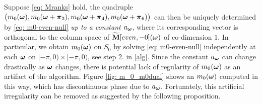 Suppose \eqref{eq: Mranks} hold, the quadruple  $\big( m_0(\boldsymbol{\omega}),m_0(\boldsymbol{\omega}+\boldsymbol{\pi}_2), m_0(\boldsymbol{\omega} +\boldsymbol{\pi}_4), m_0(\boldsymbol{\omega}+\boldsymbol{\pi}_6) \big)$ can then be uniquely determined by \eqref{eq: m0-even-null} {\it up to a constant $a_{\boldsymbol{\omega}} $}, where its corresponding vector is orthogonal to the column space of $\widetilde{\mathbf{M}}[even,-0](\boldsymbol{\omega})$ of co-dimension 1. In particular, we obtain $m_0(\boldsymbol{\omega})$ on $S_0$ by solving \eqref{eq: m0-even-null} independently at each $\boldsymbol{\omega}$ on $[-\pi,0)\times[-\pi,0)$, see step 2. in \ref{alg}. Since the constant $a_{\boldsymbol{\omega}}$ can change drastically as $\boldsymbol{\omega}$ changes, there is potential lack of regularity of $m_0(\boldsymbol{\omega})$ as an artifact of the algorithm. Figure \ref{fig: m_0_m0dual} shows an $m_0(\boldsymbol{\omega})$ computed in this way, which has discontinuous phase due to $a_{\boldsymbol{\omega}}$. Fortunately, this artificial irregularity can be removed as suggested by the following proposition.

